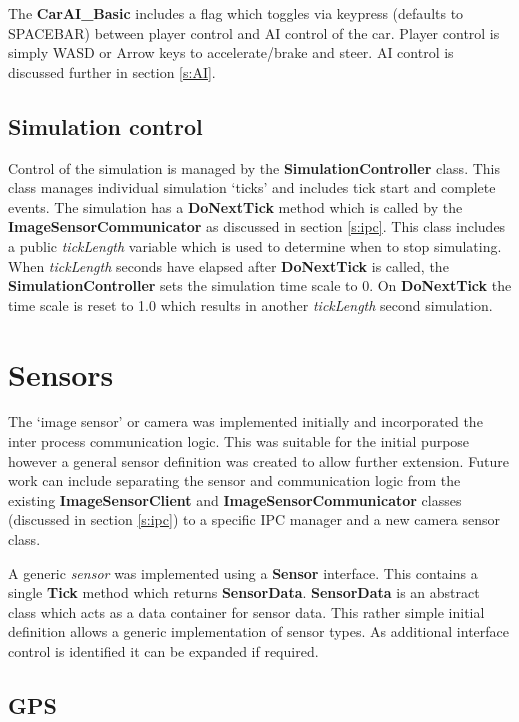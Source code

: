 \documentclass{article}
\begin{document}
The \textbf{CarAI\_Basic} includes a flag which toggles via keypress (defaults to SPACEBAR) between player control and AI control of the car. Player control is simply WASD or Arrow keys to accelerate/brake and steer. AI control is discussed further in section \ref{s:AI}.

\subsection{Simulation control}

Control of the simulation is managed by the \textbf{SimulationController} class. This class manages individual simulation `ticks' and includes tick start and complete events. The simulation has a \textbf{DoNextTick} method which is called by the \textbf{ImageSensorCommunicator} as discussed in section \ref{s:ipc}. This class includes a public \textit{tickLength} variable which is used to determine when to stop simulating. When \textit{tickLength} seconds have elapsed after \textbf{DoNextTick} is called, the \textbf{SimulationController} sets the simulation time scale to 0. On \textbf{DoNextTick} the time scale is reset to 1.0 which results in another \textit{tickLength} second simulation.

\section{Sensors} \label{s:sensors}

The `image sensor' or camera was implemented initially and incorporated the inter process communication logic. This was suitable for the initial purpose however a general sensor definition was created to allow further extension. Future work can include separating the sensor and communication logic from the existing \textbf{ImageSensorClient} and \textbf{ImageSensorCommunicator} classes (discussed in section \ref{s:ipc}) to a specific IPC manager and a new camera sensor class.

A generic \textit{sensor} was implemented using a \textbf{Sensor} interface. This contains a single \textbf{Tick} method which returns \textbf{SensorData}. \textbf{SensorData} is an abstract class which acts as a data container for sensor data. This rather simple initial definition allows a generic implementation of sensor types. As additional interface control is identified it can be expanded if required. 

\subsection{GPS}
\end{document}
